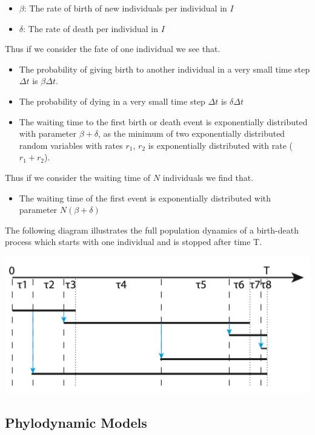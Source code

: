 \documentclass{article}
\begin{document}
\begin{multicols*}{3}
\begin{itemize}
    \item $\beta$: The rate of birth of new individuals per individual in $I$
    \item $\delta$: The rate of death per individual in $I$
\end{itemize}

Thus if we consider the fate of one individual we see that. 
\begin{itemize}
    \item The probability of giving birth to another individual in a very small time step $\Delta t$ is $\beta \Delta t$.
    \item The probability of dying in a very small time step $\Delta t$ is $\delta \Delta t$
    \item The waiting time to the first birth or death event is exponentially distributed with parameter $\beta + \delta$, as the minimum of two exponentially distributed random variables with rates $r_1$, $r_2$ is exponentially distributed with rate ($r_1 + r_2$). 
\end{itemize}

Thus if we consider the waiting time of $N$ individuals we find that.
\begin{itemize}
\item The waiting time of the first event is exponentially distributed with parameter $N(\beta + \delta)$
\end{itemize}

The following diagram illustrates the full population dynamics of a birth-death process which starts with one individual and is stopped after time T. 

\begin{center}
    \includegraphics[width=1\linewidth, angle=0.0]{bddiagram.png}
\end{center}

\subsection{Phylodynamic Models}


\end{multicols*}
\end{document}
